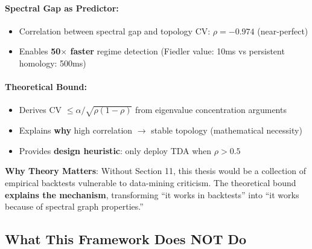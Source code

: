 \paragraph{Spectral Gap as Predictor:}
\begin{itemize}
\item Correlation between spectral gap and topology CV: $\rho = -0.974$ (near-perfect)
\item Enables \textbf{50$\times$ faster} regime detection (Fiedler value: 10ms vs persistent homology: 500ms)
\end{itemize}

\paragraph{Theoretical Bound:}
\begin{itemize}
\item Derives CV $\leq \alpha/\sqrt{\rho(1-\rho)}$ from eigenvalue concentration arguments
\item Explains \textbf{why} high correlation $\rightarrow$ stable topology (mathematical necessity)
\item Provides \textbf{design heuristic}: only deploy TDA when $\rho > 0.5$
\end{itemize}

\textbf{Why Theory Matters}: Without Section 11, this thesis would be a collection of empirical backtests vulnerable to data-mining criticism. The theoretical bound \textbf{explains the mechanism}, transforming ``it works in backtests'' into ``it works because of spectral graph properties.''

\subsection{What This Framework Does NOT Do}


